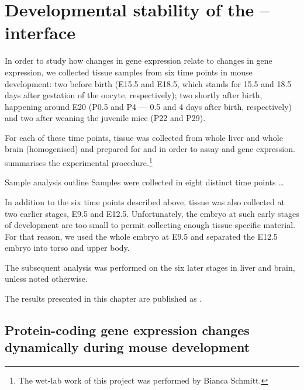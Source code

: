 \chapter{Developmental stability of the \mrna--\trna interface}

In order to study how changes in \mrna gene expression relate to changes in
\trna gene expression, we collected tissue samples from six time points in mouse
development: two before birth (E15.5 and E18.5, which stands for \num{15.5} and
\num{18.5} days after gestation of the oocyte, respectively); two shortly after
birth, happening around E20 (P0.5 and P4 --- \num{0.5} and \num{4} days after
birth, respectively) and two after weaning the juvenile mice (P22 and P29).

For each of these time points, tissue was collected from whole liver and whole
brain (homogenised) and prepared for \rnaseq and  \chipseq in order to
assay \mrna and \trna gene expression. 
summarises the experimental procedure.\footnote{The wet-lab work of this project
was performed by Bianca Schmitt.}

    {Sample analysis outline}
    {Samples were collected in eight distinct time points …}

In addition to the six time points described above, tissue was also collected at
two earlier stages, E9.5 and E12.5. Unfortunately, the embryo at such early
stages of development are too small to permit collecting enough tissue-specific
material. For that reason, we used the whole embryo at E9.5 and separated the
E12.5 embryo into torso and upper body.

The subsequent analysis was performed on the six later stages in liver and
brain, unless noted otherwise.

The results presented in this chapter are published as \citet{Schmitt:2014}.


\section{Protein-coding gene expression changes dynamically during mouse
development}

